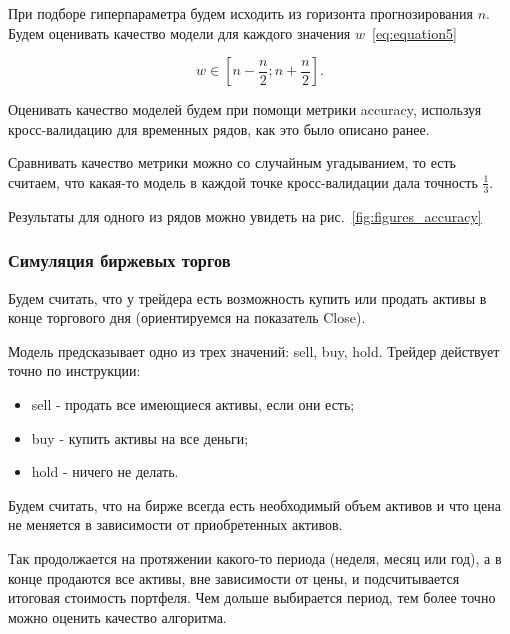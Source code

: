 \documentclass[a4paper,article,14pt]{extarticle}
\begin{document}
При подборе гиперпараметра будем исходить из горизонта прогнозирования $n$.
Будем оценивать качество модели для каждого значения $w$~\eqref{eq:equation5}

\begin{equation}
    \label{eq:equation5}
    w \in \left[ n - \frac{n}{2}; n + \frac{n}{2} \right].
\end{equation}

Оценивать качество моделей будем при помощи метрики accuracy, используя кросс-валидацию для временных рядов, как это было описано ранее.

Сравнивать качество метрики можно со случайным угадыванием, то есть считаем, что какая-то модель в каждой точке кросс-валидации дала точность $\frac{1}{3}$.

Результаты для одного из рядов можно увидеть на рис.~\ref{fig:figures_accuracy}


\subsubsection{Симуляция биржевых торгов}

Будем считать, что у трейдера есть возможность купить или продать активы в конце торгового дня (ориентируемся на показатель Close).

Модель предсказывает одно из трех значений: sell, buy, hold.
Трейдер действует точно по инструкции:

\begin{itemize}
    \item sell - продать все имеющиеся активы, если они есть;
    \item buy - купить активы на все деньги;
    \item hold - ничего не делать.
\end{itemize}

Будем считать, что на бирже всегда есть необходимый объем активов и что цена не меняется в зависимости от приобретенных активов.
\par

Так продолжается на протяжении какого-то периода (неделя, месяц или год), а в конце продаются все активы, вне зависимости от цены, и подсчитывается итоговая стоимость портфеля.
Чем дольше выбирается период, тем более точно можно оценить качество алгоритма.
\par

\end{document}
